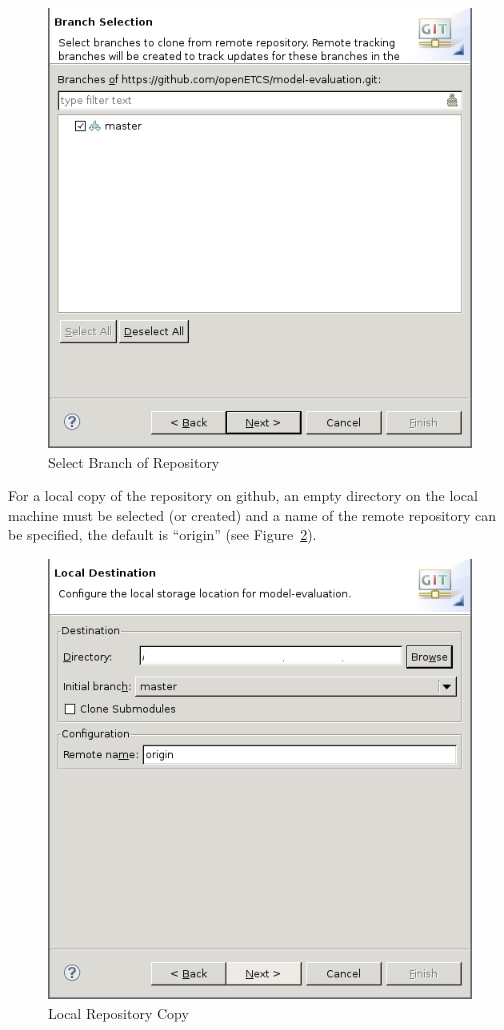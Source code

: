 \documentclass{template/openetcs_article}
\begin{document}
\begin{figure}[H]
  \centering
  \includegraphics[width=\skalierung\textwidth]{project_import_step4}
  \caption{Select Branch of Repository}
  \label{fig:select-branch}
\end{figure}

For a local copy of the repository on github, an empty directory on the local
machine must be selected (or created) and a name of the remote repository can be
specified, the default is ``origin'' (see Figure~\ref{fig:local-copy}).

\begin{figure}[H]
  \centering
  \includegraphics[width=\skalierung\textwidth]{project_import_step5}
  \caption{Local Repository Copy}
  \label{fig:local-copy}
\end{figure}
\end{document}
